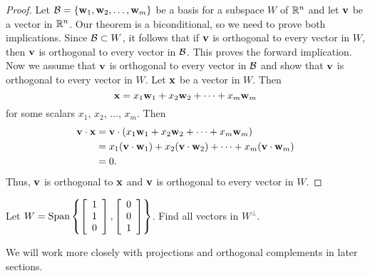 \begin{proof} Let $\mathcal{B} = \{\mathbf{w}_1, \mathbf{w}_2, \ldots, \mathbf{w}_m\}$ be a basis for a subspace $W$ of $\mathbb{R}^n$ and let $\mathbf{v}$ be a vector in $\mathbb{R}^n$. Our theorem is a biconditional, so we need to prove both implications. Since $\mathcal{B} \subset W$, it follows that if $\mathbf{v}$ is orthogonal to every vector in $W$, then $\mathbf{v}$ is orthogonal to every vector in $\mathcal{B}$. This proves the forward implication. Now we assume that $\mathbf{v}$ is orthogonal to every vector in $\mathcal{B}$ and show that $\mathbf{v}$ is orthogonal to every vector in $W$. Let $\mathbf{x}$ be a vector in $W$. Then
\[\mathbf{x} = x_1\mathbf{w}_1 + x_2\mathbf{w}_2 + \cdots + x_m\mathbf{w}_m\]
for some scalars $x_1$, $x_2$, $\ldots$, $x_m$. Then
\begin{align*}
\mathbf{v} \cdot \mathbf{x} &= \mathbf{v} \cdot (x_1\mathbf{w}_1 + x_2\mathbf{w}_2 + \cdots + x_m\mathbf{w}_m) \\
	&= x_1(\mathbf{v} \cdot \mathbf{w}_1) + x_2(\mathbf{v} \cdot \mathbf{w}_2) + \cdots + x_m(\mathbf{v} \cdot \mathbf{w}_m) \\
	&= 0.
\end{align*}
Thus, $\mathbf{v}$ is orthogonal to $\mathbf{x}$ and $\mathbf{v}$ is orthogonal to every vector in $W$.
\end{proof}

\begin{activity} Let $W = \text{Span}\left\{ \left[ \begin{array}{c} 1 \\ 1 \\ 0 \end{array} \right], \left[ \begin{array}{c} 0 \\ 0 \\ 1 \end{array} \right] \right\}$. Find all vectors in $W^{\perp}$.

\end{activity}

We will work more closely with projections and orthogonal complements in later sections.


\ExampleIntro


